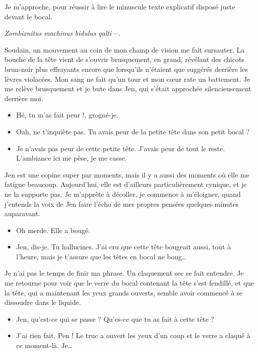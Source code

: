 Je m'approche, pour réussir à lire le minuscule texte explicatif disposé juste devant le bocal.

\textit{Zombixnitus machinus bidulus galti—}.

Soudain, un mouvement au coin de mon champ de vision me fait sursauter. La bouche de la tête vient de s'ouvrir brusquement, en grand, révélant des chicots brun-noir plus effrayants encore que lorsqu'ils n'étaient que suggérés derrière les lèvres violacées. Mon sang ne fait qu'un tour et mon cœur rate un battement. Je me relève brusquement et je bute dans Jen, qui s'était approchée silencieusement derrière moi.

\begin{itemize}
\item Hé, tu m'as fait peur !, grogné-je.
\item Oah, ne t'inquiète pas. Tu avais peur de la petite tête dans son petit bocal ?
\item Je n'avais pas peur de cette petite tête. J'avais peur de tout le reste. L'ambiance ici me pèse, je me casse.
\end{itemize}

Jen est une copine super par moments, mais il y a aussi des moments où elle me fatigue beaucoup. Aujourd'hui, elle est d'ailleurs particulièrement cynique, et je ne la supporte pas. Je m'apprête à décoller, je commence à m'éloigner, quand j'entends la voix de Jen faire l'écho de mes propres pensées quelques minutes auparavant.

\begin{itemize}
\item Oh merde. Elle a bougé.
\item Jen, dis-je. Tu hallucines. J'ai cru que cette tête bougeait aussi, tout à l'heure, mais je t'assure que les têtes en bocal ne boug…
\end{itemize}

Je n'ai pas le temps de finir ma phrase. Un claquement sec se fait entendre. Je me retourne pour voir que le verre du bocal contenant la tête s'est fendillé, et que la tête, qui a maintenant les yeux grands ouverts, semble avoir commencé à se dissoudre dans le liquide.

\begin{itemize}
\item Jen, qu'est-ce qui se passe ? Qu'es-ce que tu as fait à cette tête ?
\item J'ai rien fait, Pen ! Le truc a ouvert les yeux d'un coup et le verre a claqué à ce moment-là. Je…
\end{itemize}

